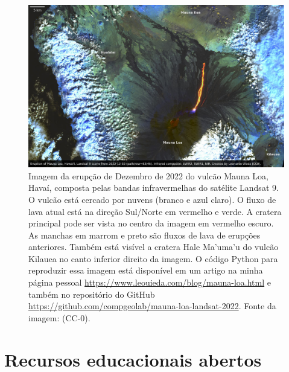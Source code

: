 \documentclass[10pt,a4paper,oneside]{book}
\begin{document}
\begin{figure}[tb]
  \begin{center}
    \includegraphics[width=\textwidth]{images/mauna-loa-landsat-2022-12-02.jpg}
  \end{center}
  \caption{
    Imagem da erupção de Dezembro de 2022 do vulcão Mauna Loa, Havaí, composta
    pelas bandas infravermelhas do satélite Landsat 9.
    O vulcão está cercado por nuvens (branco e azul claro). O fluxo de lava
    atual está na direção Sul/Norte em vermelho e verde. A cratera principal
    pode ser vista no centro da imagem em vermelho escuro.
    As manchas em marrom e preto são fluxos de lava de erupções anteriores.
    Também está visível a cratera Hale Ma'uma'u do vulcão Kīlauea no canto
    inferior direito da imagem.
    O código Python para reproduzir essa imagem está disponível em um artigo na
    minha página pessoal \url{https://www.leouieda.com/blog/mauna-loa.html} e
    também no repositório do GitHub
    \url{https://github.com/compgeolab/mauna-loa-landsat-2022}.
    Fonte da imagem: \citet{Uieda2022maunaloa} (CC-0).
  }
  \label{fig_maunaloa}
\end{figure}

\section{Recursos educacionais abertos}
\label{sec_openedu}
\end{document}
